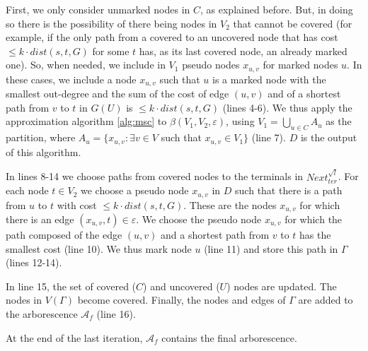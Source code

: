 First, we only consider unmarked nodes in $C$, as explained before. But, in doing so there is the possibility of there being nodes in $V_2$ that cannot
be covered (for example, if the only path from a covered to an uncovered node that has cost $\le k \cdot dist(s,t,G)$ for some $t$ has, as its last covered node, an already marked one).
So, when needed, we include in $V_1$ pseudo nodes $x_{u, v}$ for marked nodes $u$. In these cases, we include a node $x_{u, v}$ such that $u$ is a marked node 
with the smallest out-degree and
the sum of the cost of edge $(u, v)$ and of a shortest path from $v$ to $t$ in $G(U)$ is $\le k \cdot dist(s,t,G)$ (lines 4-6). 
We thus apply the approximation algorithm \ref{alg:msc} to $\beta (V_1, V_2, \varepsilon)$, using $V_1 = \bigcup_{u \in C}A_u$ as the partition,
where $A_u=\{x_{u,v} : \exists v \in V$ such that $x_{u,v} \in V_1\}$ (line 7). $D$ is the output of this algorithm.

In lines 8-14 we choose paths from covered nodes to the terminals in $Next^{\sqrt{l}}_{ter}$. For each node $t \in V_2$ we choose
a pseudo node $x_{u, v}$ in $D$ such that there is a path from $u$ to $t$ with cost $\le k \cdot dist(s,t,G)$. These are the nodes $x_{u, v}$ for which
there is an edge $(x_{u, v}, t) \in \varepsilon$. We choose the pseudo node $x_{u, v}$ for which the path composed of the edge $(u, v)$ and
a shortest path from $v$ to $t$ has the smallest cost (line 10). We thus mark node $u$ (line 11) and store this path in $\varGamma$ (lines 12-14).

In line 15, the set of covered ($C$) and uncovered ($U$) nodes are updated. The nodes in $V(\varGamma)$ become covered. Finally, 
the nodes and edges of $\varGamma$ are added to the arborescence $\mathcal{A}_f$ (line 16). 

At the end of the last iteration, $\mathcal{A}_f$ contains the final arborescence.


